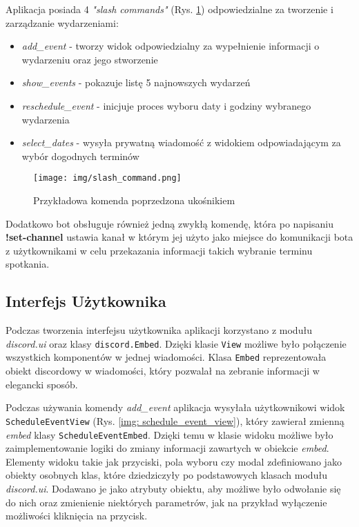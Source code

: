 \documentclass[12pt,a4paper]{article}
\newcommand{\classname}[1]{\texttt{#1}}
\begin{document}
Aplikacja posiada 4 \textit{"slash commands"} (Rys. \ref{img: slash_command}) odpowiedzialne za tworzenie i zarządzanie wydarzeniami:
\begin{itemize}
    \item \textit{add\_event} - tworzy widok odpowiedzialny za wypełnienie informacji o wydarzeniu oraz jego stworzenie
    \item \textit{show\_events} - pokazuje listę 5 najnowszych wydarzeń
    \item \textit{reschedule\_event} - inicjuje proces wyboru daty i godziny wybranego wydarzenia
    \item \textit{select\_dates} - wysyła prywatną wiadomość z widokiem odpowiadającym za wybór dogodnych terminów
\end{itemize}

\begin{figure}[H]
    \centering
    \texttt{[image: img/slash\_command.png]}
    \caption{Przykładowa komenda poprzedzona ukośnikiem}
    \label{img: slash_command}
\end{figure}

Dodatkowo bot obsługuje również jedną zwykłą komendę, która po napisaniu \textbf{!set-channel}
ustawia kanał w którym jej użyto jako miejsce do komunikacji bota z użytkownikami w celu przekazania informacji takich wybranie terminu spotkania.

\subsection{Interfejs Użytkownika}

Podczas tworzenia interfejsu użytkownika aplikacji korzystano z modułu \textit{discord.ui} \cite{BotUIKit} oraz klasy \classname{discord.Embed}. Dzięki klasie \classname{View} możliwe było połączenie wszystkich komponentów w jednej wiadomości. Klasa \classname{Embed} reprezentowała obiekt discordowy w wiadomości, który pozwalał na zebranie informacji w elegancki sposób.

Podczas używania komendy \textit{add\_event} aplikacja wysyłała użytkownikowi widok \classname{ScheduleEventView} (Rys. \ref{img: schedule_event_view}), który zawierał zmienną \textit{embed} klasy \classname{ScheduleEventEmbed}. Dzięki temu w klasie widoku możliwe było zaimplementowanie logiki do zmiany informacji zawartych w obiekcie \textit{embed}. Elementy widoku takie jak przyciski, pola wyboru czy modal zdefiniowano jako obiekty osobnych klas, które dziedziczyły po podstawowych klasach modułu \textit{discord.ui}. Dodawano je jako atrybuty obiektu, aby możliwe było odwołanie się do nich oraz zmienienie niektórych parametrów, jak na przykład wyłączenie możliwości kliknięcia na przycisk.
\end{document}
